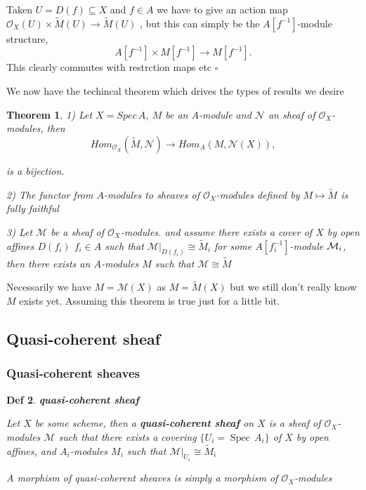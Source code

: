 \documentclass{article}
\newtheorem{theorem}{Theorem}[section]
\newtheorem{definition}[theorem]{Def}
\newenvironment{Proof}{{\noindent \indent \it Proof:\quad}}{\hfill $\square$\par}
\begin{document}
\begin{Proof}
    Taken $U=D(f)\subseteq X$ and $f\in A$ we have to give an action map ${\mathcal{O}}_{X}(U)\times{\widetilde{M}}(U)\to{\widetilde{M}}(U)$ , but this can simply be the $A[f^{-1}]$-module structure,
$$
A[f^{-1}]\times M[f^{-1}]\longrightarrow M[f^{-1}]. 
$$
This clearly commutes with restrction maps etc
\end{Proof}

We now have the techincal theorem which drives the types of results we desire

\begin{theorem}

1) Let $X=Spec\, A$, $M$ be an $A$-module and $\mathcal N$ an sheaf of $\mathcal O_X$-modules, then 
$$
Hom_{\mathcal{O}_{X}} (\widetilde M, \mathcal N ) \to Hom_A(M, \mathcal N (X)),
$$

is a bijection.

2) The functor from $A$-modules to sheaves of ${\mathcal{O}}_{X}$-modules defined by $M\mapsto{\widetilde{{M}}}$ is fully faithful
    
3) Let $\mathcal M$ be a sheaf of ${\mathcal{O}}_{X}$-modules. and assume there exists a cover of $X$ by open affines $D(f_{i})$  $f_{i}\in A$ such that $\mathcal{M}|_{D(f_{i})}\cong\widetilde{M}_{i}$ for some $A[f_{i}^{-1}]$-module ${\cal M}_{i}$, then there exists an $A$-modules ${M}$ such that $\mathcal{M}\cong\widetilde{M}$ 
\label{Thm 3.45}
\end{theorem}



Necessarily we have $M={\mathcal{M}}(X)$ as $M={\widetilde{M}}(X)$  but we still don't really know $M$ exists yet. Assuming this theorem is true just for a little bit.




\newpage
\subsection{Quasi-coherent sheaf}
\subsubsection{Quasi-coherent sheaves}
\begin{definition}
\textbf{quasi-coherent sheaf}

    Let $X$ be some scheme, then a \textbf{quasi-coherent sheaf} on $X$ is a sheaf of ${\mathcal{O}}_{X}$-modules $\mathcal M$ such that there exists a covering $\{U_{i}=\operatorname{Spec}\,A_{i}\}$ of $X$ by open affines, and $A_{i}$-modules ${M}_{i}$ such that $\mathcal{M}|_{U_{i}}\cong\widetilde{M}_{i}$

    A morphism of quasi-coherent sheaves is simply a morphism of ${\mathcal{O}}_{X}$-modules
\end{definition} 
\end{document}
